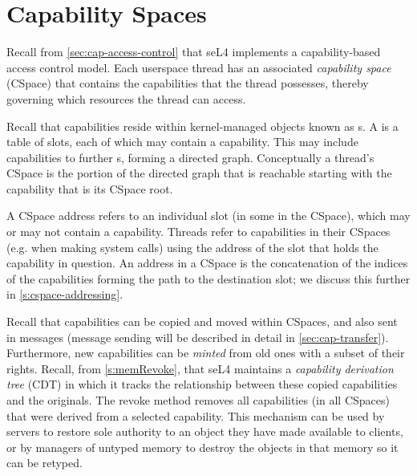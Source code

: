 %
%
%
%

\chapter{\label{ch:cspace}Capability Spaces}

Recall from \autoref{sec:cap-access-control} that seL4 implements a
capability-based access control model.  Each userspace thread has an
associated \emph{capability space} (CSpace) that contains the
capabilities that the thread possesses, thereby governing which
resources the thread can access.

Recall that capabilities reside within kernel-managed objects known as
s. A  is a table of slots, each of which may
contain a capability. This may include capabilities to further
s, forming a directed graph. Conceptually a thread's CSpace
is the portion of the directed graph that is reachable starting with
the  capability that is its CSpace root.

A CSpace address refers to an individual slot (in
some  in the CSpace), which may or may not contain a
capability. Threads refer to capabilities in their CSpaces (e.g. when
making system calls) using the address of the slot that holds the
capability in question.  An address in a CSpace is the concatenation
of the indices of the  capabilities forming the path to the
destination slot; we discuss this further in
\autoref{s:cspace-addressing}.

Recall that capabilities can be copied and moved within CSpaces, and
also sent in messages (message sending will be described in detail in
\autoref{sec:cap-transfer}).  Furthermore, new capabilities can be
\emph{minted} from old ones with a subset of their rights.  Recall,
from \autoref{s:memRevoke}, that seL4 maintains a \emph{capability
  derivation tree} (CDT) in which it tracks the relationship between
these copied capabilities and the originals.  The revoke method
removes all capabilities (in all CSpaces) that were derived from a
selected capability. This mechanism can be used by servers to restore
sole authority to an object they have made available to clients, or by
managers of untyped memory to destroy the objects in that memory so it
can be retyped.

